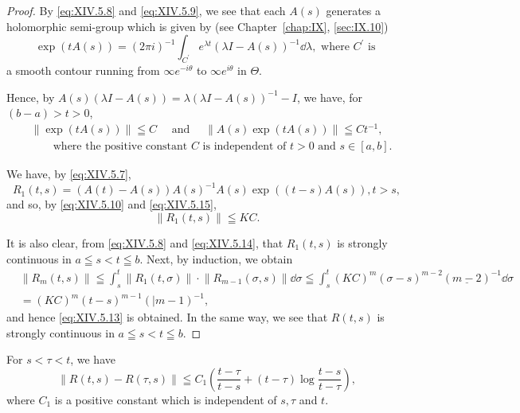 \begin{proof}
 By \eqref{eq:XIV.5.8} and \eqref{eq:XIV.5.9}, we see that each $A(s)$ generates a holomorphic semi-group which is given by (see Chapter~\ref{chap:IX}, \ref{sec:IX.10}) 
\begin{equation}\label{eq:XIV.5.14}
\exp (t A (s)) = (2 \pi i) ^{-1} \int_ {C ^{\prime}} e ^{\lambda t} (\lambda I - A (s)) ^{-1} \dd \lambda , \text{ where } C ^{\prime} \text{ is }
\end{equation}
a smooth contour running from $\infty e^{-i\theta}$ to $\infty e^{i\theta}$ in $\Theta$. 

Hence, by $A(s)(\lambda I - A(s)) = \lambda (\lambda I - A(s))^{-1} - I$, we have, for $(b - a) > t > 0$, 
\begin{equation}\label{eq:XIV.5.15}
\begin{aligned}
&\left\| \exp (t A (s)) \right\| \leqq C \quad \text{ and } \quad \left\| A (s) \exp (t A (s)) \right\| \leqq C t ^{-1}, \\
&\qquad \text{where the positive constant } C \text{ is independent of } t > 0 \text{ and } s\in [a,b].
\end{aligned}
\end{equation}


We have, by \eqref{eq:XIV.5.7}, 
\[
R _{1} (t, s) = \left(A (t) - A (s)\right) A (s) ^{-1} A (s) \exp ((t - s) A (s)), t > s,
\]
and so, by \eqref{eq:XIV.5.10} and \eqref{eq:XIV.5.15}, 
\begin{equation}\label{eq:XIV.5.16}
\left\| R _{1} (t, s) \right\| \leqq K C.
\end{equation}

It is also clear, from \eqref{eq:XIV.5.8} and \eqref{eq:XIV.5.14}, that $R_{1}(t,s)$ is strongly continuous in $a \leqq s < t \leqq b$. Next, by induction, we obtain 
\[
\begin{aligned}
&\left\| R _{m} (t, s) \right\|  \leqq \int_{s} ^{t} \left\| R _{1} (t, \sigma) \right\| \cdot \left\| R _{m-1} (\sigma , s) \right\| \dd \sigma \leqq \int_{s} ^{t} (K C) ^{m} (\sigma - s) ^{m-2} (\underline {{m - 2}}) ^{-1} \dd \sigma \\
&= (K C) ^{m} (t - s) ^{m-1} (| m - 1) ^{-1},
\end{aligned}
\]
and hence \eqref{eq:XIV.5.13} is obtained. In the same way, we see that $R(t, s)$ is strongly continuous in $a \leqq s < t \leqq b$. 
\end{proof}

\begin{lemma}\label{lem:XIV.5.Lemma.2} For $s < \tau < t$, we have 
\begin{equation}\label{eq:XIV.5.17}
\left\| R (t, s) - R (\tau , s) \right\| \leqq C _{1} \left(\frac {t - \tau}{t - s} + (t - \tau) \log \frac {t - s}{t - \tau}\right),
\end{equation}
where $C_1$ is a positive constant which is independent of $s, \tau$ and $t$. 
\end{lemma}

